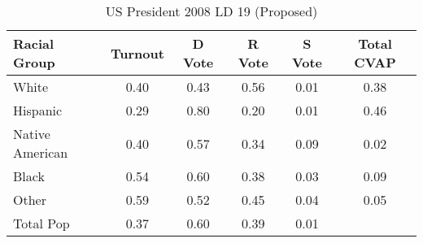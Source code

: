 \begin{table}[htb]
\begin{center}
\caption{US President 2008 LD 19 (Proposed)}
\label{pres08_cvap_ld_19}
\begin{tabular}{lccccc}
  \hline
Racial Group & Turnout & D Vote & R Vote & S Vote & Total CVAP \\ 
  \hline
White & 0.40 & 0.43 & 0.56 & 0.01 & 0.38 \\ 
  Hispanic & 0.29 & 0.80 & 0.20 & 0.01 & 0.46 \\ 
  Native American & 0.40 & 0.57 & 0.34 & 0.09 & 0.02 \\ 
  Black & 0.54 & 0.60 & 0.38 & 0.03 & 0.09 \\ 
  Other & 0.59 & 0.52 & 0.45 & 0.04 & 0.05 \\ 
  Total Pop & 0.37 & 0.60 & 0.39 & 0.01 &  \\ 
   \hline
\end{tabular}
\end{center}
\end{table}
